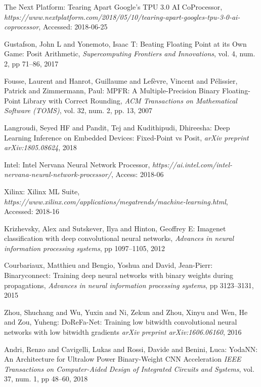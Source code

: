 \documentclass[techrep,english]{ipsj}
\begin{document}
\begin{thebibliography}{99}
  The Next Platform:
  Tearing Apart Google’s TPU 3.0 AI CoProcessor,
  {\it https://www.nextplatform.com/2018/05/10/tearing-apart-googles-tpu-3-0-ai-coprocessor},
  Accessed: 2018-06-25
    
  Gustafson, John L and Yonemoto, Isaac T:
  Beating Floating Point at its Own Game: Posit Arithmetic,
  {\it Supercomputing Frontiers and Innovations},
  vol. 4, num. 2, pp 71--86, 2017

  Fousse, Laurent and Hanrot, Guillaume and Lef{\`e}vre, Vincent and P{\'e}lissier, Patrick and Zimmermann, Paul:
  MPFR: A Multiple-Precision Binary Floating-Point Library with Correct Rounding,
  {\it ACM Transactions on Mathematical Software (TOMS)},
  vol. 32, num. 2, pp. 13, 2007


  Langroudi, Seyed HF and Pandit, Tej and Kudithipudi, Dhireesha:
  Deep Learning Inference on Embedded Devices: Fixed-Point vs Posit,
  {\it arXiv preprint arXiv:1805.08624},
  2018

  Intel:
  Intel Nervana Neural Network Processor,
  {\it https://ai.intel.com/intel-nervana-neural-network-processor/},
  Access: 2018-06

  Xilinx:
  Xilinx ML Suite,
  {\it https://www.xilinx.com/applications/megatrends/machine-learning.html},
  Accessed: 2018-16

  Krizhevsky, Alex and Sutskever, Ilya and Hinton, Geoffrey E:
  Imagenet classification with deep convolutional neural networks,
  {\it Advances in neural information processing systems},
  pp 1097–1105, 2012

  Courbariaux, Matthieu and Bengio, Yoshua and David, Jean-Pierr:
  Binaryconnect: Training deep neural networks with binary weights during propagations,
  {\it Advances in neural information processing systems},
  pp 3123–3131, 2015

  Zhou, Shuchang and Wu, Yuxin and Ni, Zekun and Zhou, Xinyu and Wen, He and Zou, Yuheng:
  DoReFa-Net: Training low bitwidth convolutional neural networks with low bitwidth gradients
  {\it  arXiv preprint arXiv:1606.06160},
  2016

  Andri, Renzo and Cavigelli, Lukas and Rossi, Davide and Benini, Luca:
  YodaNN: An Architecture for Ultralow Power Binary-Weight CNN Acceleration
  {\it IEEE Transactions on Computer-Aided Design of Integrated Circuits and Systems},
  vol. 37, num. 1, pp 48–60, 2018


\end{thebibliography}
\end{document}
